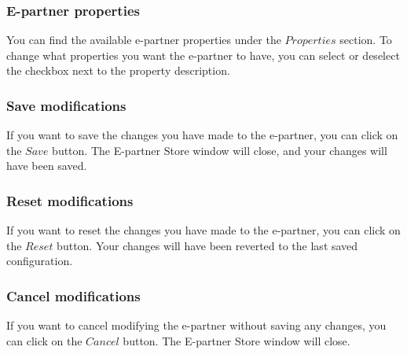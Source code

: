 \documentclass[11pt,a4paper]{article}
\begin{document}
\subsubsection{E-partner properties}
You can find the available e-partner properties under the $Properties$ section. To change what properties you want the e-partner to have, you can select or deselect the checkbox next to the property description.

\subsubsection{Save modifications}
If you want to save the changes you have made to the e-partner, you can click on the $Save$ button. The E-partner Store window will close, and your changes will have been saved.

\subsubsection{Reset modifications}
If you want to reset the changes you have made to the e-partner, you can click on the $Reset$ button. Your changes will have been reverted to the last saved configuration.

\subsubsection{Cancel modifications}
If you want to cancel modifying the e-partner without saving any changes, you can click on the $Cancel$ button. The E-partner Store window will close.
\end{document}
